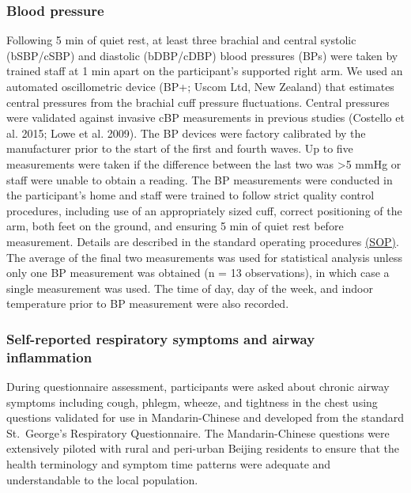 \documentclass[
  letterpaper,
  DIV=11,
  numbers=noendperiod]{scrartcl}
\begin{document}
\subsubsection{Blood pressure}\label{blood-pressure}

Following 5 min of quiet rest, at least three brachial and central
systolic (bSBP/cSBP) and diastolic (bDBP/cDBP) blood pressures (BPs)
were taken by trained staff at 1 min apart on the participant's
supported right arm. We used an automated oscillometric device (BP+;
Uscom Ltd, New Zealand) that estimates central pressures from the
brachial cuff pressure fluctuations. Central pressures were validated
against invasive cBP measurements in previous studies (Costello et al.
2015; Lowe et al. 2009). The BP devices were factory calibrated by the
manufacturer prior to the start of the first and fourth waves. Up to
five measurements were taken if the difference between the last two was
\textgreater5 mmHg or staff were unable to obtain a reading. The BP
measurements were conducted in the participant's home and staff were
trained to follow strict quality control procedures, including use of an
appropriately sized cuff, correct positioning of the arm, both feet on
the ground, and ensuring 5 min of quiet rest before measurement. Details
are described in the standard operating procedures
\href{https://osf.io/gmka5}{(SOP)}. The average of the final two
measurements was used for statistical analysis unless only one BP
measurement was obtained (n = 13 observations), in which case a single
measurement was used. The time of day, day of the week, and indoor
temperature prior to BP measurement were also recorded.

\subsubsection{Self-reported respiratory symptoms and airway
inflammation}\label{self-reported-respiratory-symptoms-and-airway-inflammation}

During questionnaire assessment, participants were asked about chronic
airway symptoms including cough, phlegm, wheeze, and tightness in the
chest using questions validated for use in Mandarin-Chinese and
developed from the standard St.~George's Respiratory Questionnaire. The
Mandarin-Chinese questions were extensively piloted with rural and
peri-urban Beijing residents to ensure that the health terminology and
symptom time patterns were adequate and understandable to the local
population.
\end{document}
